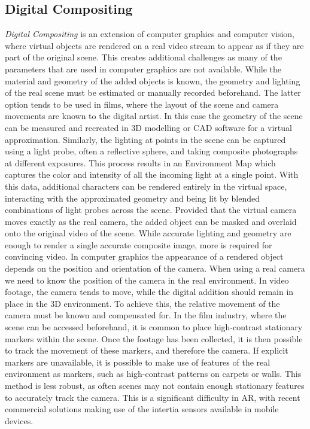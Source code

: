 \documentclass[ %
                    author={Gavin Parker},
                supervisor={Dr. Neill Campbell},
                    degree={MEng},
                     title={Deep Siamese Networks for Illumination Estimation from Stereo Images},
                  subtitle={},
                      type={Research},
                      year={2018} ]{dissertation}
\begin{document}
\subsection{Digital Compositing}
\textit{Digital Compositing} is an extension of computer graphics and computer vision, where virtual objects are rendered on a real video stream to appear as if they are part of the original scene. This creates additional challenges as many of the parameters that are used in computer graphics are not available. While the material and geometry of the added objects is known, the geometry and lighting of the real scene must be estimated or manually recorded beforehand. The latter option tends to be used in films, where the layout of the scene and camera movements are known to the digital artist. In this case the geometry of the scene can be measured and recreated in 3D modelling or CAD software for a virtual approximation.
\newline
Similarly, the lighting at points in the scene can be captured using a light probe, often a reflective sphere, and taking composite photographs at different exposures. This process results in an Environment Map which captures the color and intensity of all the incoming light at a single point. With this data, additional characters can be rendered entirely in the virtual space, interacting with the approximated geometry and being lit by blended combinations of light probes across the scene. Provided that the virtual camera moves exactly as the real camera, the added object can be masked and overlaid onto the original video of the scene.
\newline
While accurate lighting and geometry are enough to render a single accurate composite image, more is required for convincing video.  In computer graphics the appearance of a rendered object depends on the position and orientation of the camera. When using a real camera we need to know the position of the camera in the real environment.  In video footage, the camera tends to move, while the digital addition should remain in place in the 3D environment. To achieve this, the relative movement of the camera must be known and compensated for. In the film industry, where the scene can be accessed beforehand, it is common to place high-contrast stationary markers within the scene. Once the footage has been collected, it is then possible to track the movement of these markers, and therefore the camera. If explicit markers are unavailable, it is possible to make use of features of the real environment as markers, such as high-contrast patterns on carpets or walls. This method is less robust, as often scenes may not contain enough stationary features to accurately track the camera. This is a significant difficulty in AR, with recent commercial solutions making use of the intertia sensors available in mobile devices.
\newpage
\end{document}
